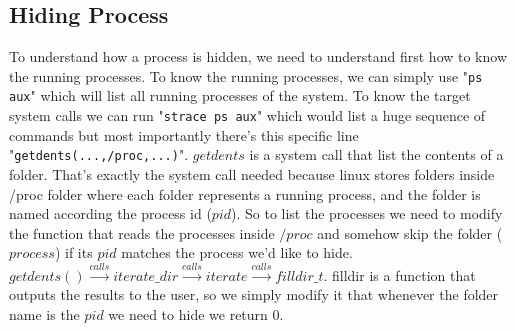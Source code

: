 \documentclass[12pt]{article}
\begin{document}
	 \subsection{Hiding Process}
	 To understand how a process is hidden, we need to understand first how to know the running processes. To know the running processes, we can simply use "\lstinline|ps aux|" which will list all running processes of the system. To know the target system calls we can run "\lstinline|strace ps aux|" which would list a huge sequence of commands but most importantly there's this specific line "\lstinline|getdents(...,/proc,...)|". $getdents$ is a system call that list the contents of a folder. That's exactly the system call needed because linux stores folders inside /proc folder where each folder represents a running process, and the folder is named according the process id ($pid$). So to list the processes we need to modify the function that reads the processes inside $/proc$ and somehow skip the folder ($process$) if its $pid$ matches the process we'd like to hide. $getdents() \xrightarrow{calls} iterate\_dir \xrightarrow{calls} iterate \xrightarrow{calls} filldir\_t$. filldir is a function that outputs the results to the user, so we simply modify it that whenever the folder name is the $pid$ we need to hide we return $0$.
\end{document}
